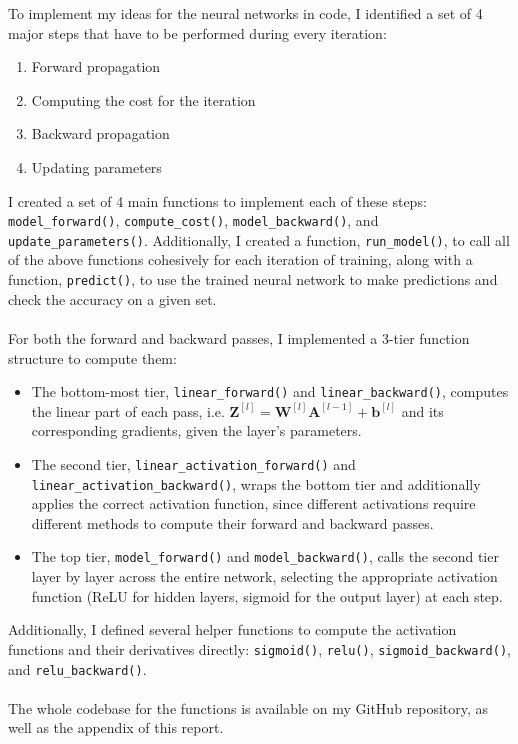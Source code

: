 \documentclass{article}
\begin{document}
To implement my ideas for the neural networks in code, I identified a set of 4 major steps that have to be performed during every iteration:
\begin{enumerate}
    \item Forward propagation
    \item Computing the cost for the iteration
    \item Backward propagation
    \item Updating parameters
\end{enumerate}
I created a set of 4 main functions to implement each of these steps: \verb|model_forward()|, \verb|compute_cost()|, \verb|model_backward()|, and \verb|update_parameters()|. Additionally, I created a function, \verb|run_model()|, to call all of the above functions cohesively for each iteration of training, along with a function, \verb|predict()|, to use the trained neural network to make predictions and check the accuracy on a given set.
\\\\
For both the forward and backward passes, I implemented a 3-tier function structure to compute them:
\begin{itemize}
    \item The bottom-most tier, \verb|linear_forward()| and \verb|linear_backward()|, computes the linear part of each pass, i.e. $\mathbf{Z}^{[l]} = \mathbf{W}^{[l]}\mathbf{A}^{[l-1]} + \mathbf{b}^{[l]}$ and its corresponding gradients, given the layer's parameters.
    \item The second tier, \verb|linear_activation_forward()| and \verb|linear_activation_backward()|, wraps the bottom tier and additionally applies the correct activation function, since different activations require different methods to compute their forward and backward passes.
    \item The top tier, \verb|model_forward()| and \verb|model_backward()|, calls the second tier layer by layer across the entire network, selecting the appropriate activation function (ReLU for hidden layers, sigmoid for the output layer) at each step.
\end{itemize}
Additionally, I defined several helper functions to compute the activation functions and their derivatives directly: \verb|sigmoid()|, \verb|relu()|, \verb|sigmoid_backward()|, and \verb|relu_backward()|.
\\\\
The whole codebase for the functions is available on my GitHub repository, as well as the appendix of this report. %
\end{document}
